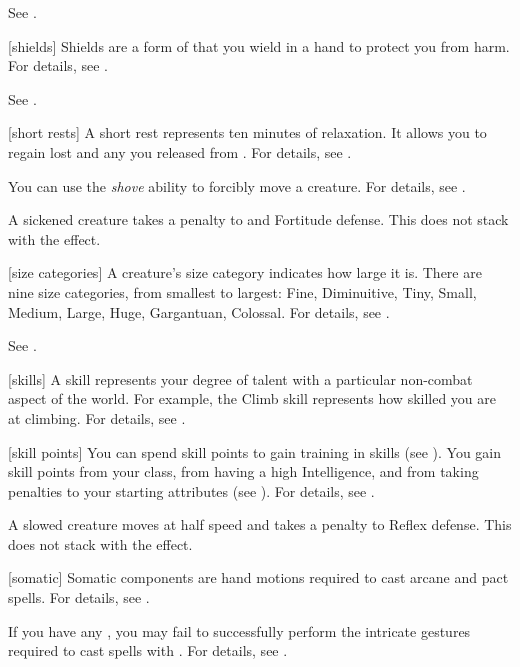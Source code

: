  See .

[shields] Shields are a form of  that you wield in a hand to protect you from harm.
For details, see .

 See .

[short rests] A short rest represents ten minutes of relaxation.
It allows you to regain lost  and any  you released from .
For details, see .

 You can use the \textit{shove} ability to forcibly move a creature.
For details, see .

 A sickened creature takes a  penalty to  and Fortitude defense.
This does not stack with the  effect.

[size categories] A creature's size category indicates how large it is.
There are nine size categories, from smallest to largest: Fine, Diminuitive, Tiny, Small, Medium, Large, Huge, Gargantuan, Colossal.
For details, see .

 See .

[skills] A skill represents your degree of talent with a particular non-combat aspect of the world.
For example, the Climb skill represents how skilled you are at climbing.
For details, see .

[skill points] You can spend skill points to gain training in skills (see ).
You gain skill points from your class, from having a high Intelligence, and from taking penalties to your starting attributes (see ).
For details, see .

 A slowed creature moves at half speed and takes a  penalty to Reflex defense.
This does not stack with the  effect.

[somatic] Somatic components are hand motions required to cast arcane and pact spells.
For details, see .

 If you have any , you may fail to successfully perform the intricate gestures required to cast spells with .
For details, see .

